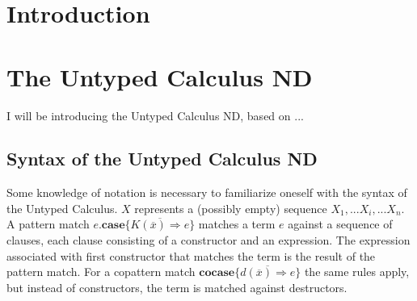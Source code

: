 \documentclass[twoside,12pt,a4paper]{article}
\begin{document}
\section{Introduction}


\section{The Untyped Calculus ND}

I will be introducing the Untyped Calculus ND, based on ... %

\subsection{Syntax of the Untyped Calculus ND}



Some knowledge of notation is necessary to familiarize oneself with the syntax of the Untyped Calculus.
$X$ represents a (possibly empty) sequence $X_1, ... X_i, ... X_n$.  
\\
A pattern match $e.\textbf{case}\{\overline{K(\overline{x})\Rightarrow e}\}$ 
matches a term $e$ against a sequence of clauses, each clause consisting of a constructor and an expression.
The expression associated with first constructor %
that matches the term is the result of the pattern match. %
For a copattern match $\textbf{cocase} \{\overline{d(\overline{x}) \Rightarrow e}\}$
the same rules apply, but instead of constructors, the term is matched against destructors.

\iffalse
\begin{equation}
    \begin{split}
        e ::&= x \quad \text{Variables} \\
        &| \; \constructor       \quad \text{Constructors} \\
        &| \; \destructor         \quad \text{Destructors} \\
        &| \; \patmatch       \quad \text{Pattern match}\\
        &| \; \copatmatch      \quad \text{Copattern match}
    \end{split}
\end{equation}
\fi
\end{document}
